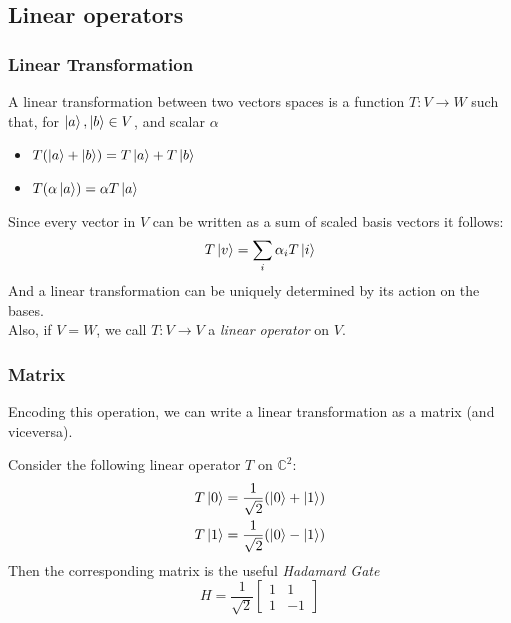 \documentclass{beamer}
\begin{document}
    \subsection{Linear operators}
    \begin{frame}
        \frametitle{Linear Transformation}
        A linear transformation between two vectors spaces is a function $T: V \to W$ such that, for $\ket{a}, \ket{b} \in V$, and scalar $\alpha$
        \begin{itemize}
            \item $T(\ket{a} + \ket{b}) = T\ket{a} + T\ket{b}$
            \item $T(\alpha\ket{a})  = \alpha T\ket{a}$
        \end{itemize}
        Since every vector in $V$ can be written as a sum of scaled basis vectors it follows:
        \[ T\ket{v} = \sum_i \alpha_i T\ket{i}  \] 
        And a linear transformation can be uniquely determined by its action on the bases. \\
        Also, if $V = W$, we call $T: V \to V$ a \textit{linear operator} on $V$.
    \end{frame}
    \begin{frame}
        \frametitle{Matrix}
        Encoding this operation, we can write a linear transformation as a matrix (and viceversa).
        \begin{example}
            Consider the following linear operator $T$ on $\mathbb{C}^2$:
            \begin{align}
                T\ket{0} &= \frac{1}{\sqrt{2}}(\ket{0} + \ket{1}) \\
                T\ket{1} &= \frac{1}{\sqrt{2}}(\ket{0} - \ket{1})
            \end{align}
            Then the corresponding matrix is the useful \textit{Hadamard Gate} 
            \begin{equation}
                \label{Hadamard}
                H = \frac{1}{\sqrt{2}}
                    \begin{bmatrix}
                        1 & 1 \\
                        1 & -1 
                    \end{bmatrix}
            \end{equation}
        \end{example}
    \end{frame}
\end{document}
